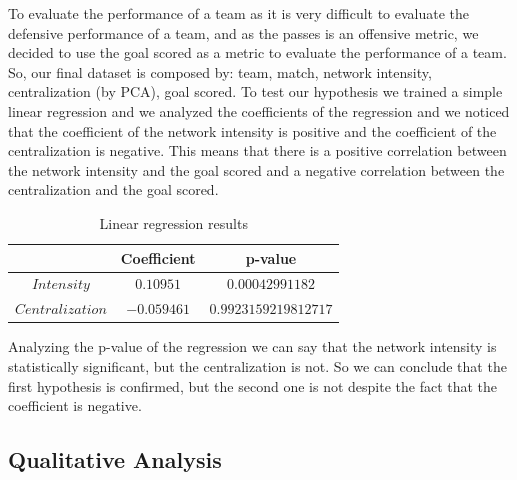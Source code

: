 \documentclass[12pt, a4paper]{article}
\begin{document}
To evaluate the performance of a team as it is very difficult to evaluate the defensive performance of a team, and as the passes is an offensive metric, we decided to use the goal scored as a metric to evaluate the performance of a team. \\
So, our final dataset is composed by: team, match, network intensity, centralization (by PCA), goal scored. To test our hypothesis we trained a simple linear regression and we analyzed the coefficients of the regression and we noticed that the coefficient of the network intensity is positive and the coefficient of the centralization is negative. This means that there is a positive correlation between the network intensity and the goal scored and a negative correlation between the centralization and the goal scored. \\

\begin{table}[H]
    \centering
    \begin{tabular}{|c|c|c|}
            \hline
            & Coefficient & p-value \\
            \hline
            $Intensity$  &  $0.10951$ & $0.00042991182$  \\
            \hline
            $Centralization$  &  $-0.059461$  &  $0.9923159219812717$ \\
            \hline
    \end{tabular}
    \caption{Linear regression results}
\end{table}

Analyzing the p-value of the regression we can say that the network intensity is statistically significant, but the centralization is not. So we can conclude that the first hypothesis is confirmed, but the second one is not despite the fact that the coefficient is negative. \\

\subsection{Qualitative Analysis}
\label{qualitative-analysis}
\end{document}
